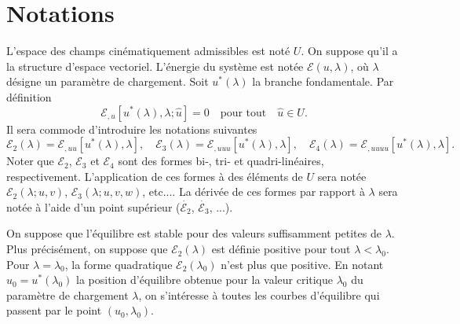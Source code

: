 \documentclass[12pt, final]{amsart}
\begin{document}
\title{\sbtitle}
\author{\sbauthor}
\address{\sbaddress}

\begin{abstract}
  blabla
\end{abstract}

\maketitle

\section{Notations}

L'espace des champs cin{\'e}matiquement admissibles est not{\'e} $U$. On
suppose qu'il a la structure d'espace vectoriel. L'{\'e}nergie du syst{\`e}me
est not{\'e}e $\mathcal{E} (u, \lambda)$, o{\`u} $\lambda$ d{\'e}signe un
param{\`e}tre de chargement. Soit $u^{\ast} (\lambda)$ la branche
fondamentale. Par d{\'e}finition
\begin{equation}
  \mathcal{E}_{, u} [u^{\ast} (\lambda), \lambda ; \hat{u}] = 0 \quad
  \text{pour tout} \quad \hat{u} \in U.
\end{equation}
Il sera commode d'introduire les notations suivantes
\begin{equation}
  \mathcal{E}_2 (\lambda) =\mathcal{E}_{, u  u}  [u^{\ast} (\lambda),
  \lambda], \quad \mathcal{E}_3 (\lambda) =\mathcal{E}_{, u  u
   u} [u^{\ast} (\lambda), \lambda], \quad \mathcal{E}_4 (\lambda)
  =\mathcal{E}_{, u  u  u  u} [u^{\ast} (\lambda),
  \lambda] .
\end{equation}
Noter que $\mathcal{E}_2$, $\mathcal{E}_3$ et $\mathcal{E}_4$ sont des formes
bi-, tri- et quadri-lin{\'e}aires, respectivement. L'application de ces formes
{\`a} des {\'e}l{\'e}ments de $U$ sera not{\'e}e $\mathcal{E}_2 (\lambda ; u,
v)$, $\mathcal{E}_3 (\lambda ; u, v, w)$, etc.... La d{\'e}riv{\'e}e de ces
formes par rapport {\`a} $\lambda$ sera not{\'e}e {\`a} l'aide d'un point
sup{\'e}rieur ($\dot{\mathcal{E}_2}$, $\dot{\mathcal{E}_3}$, ...).

On suppose que l'{\'e}quilibre est stable pour des valeurs suffisamment
petites de $\lambda$. Plus pr{\'e}cis{\'e}ment, on suppose que $\mathcal{E}_2
(\lambda)$ est d{\'e}finie positive pour tout $\lambda < \lambda_0$. Pour
$\lambda = \lambda_0$, la forme quadratique $\mathcal{E}_2 (\lambda_0)$ n'est
plus que positive. En notant $u_0 = u^{\ast} (\lambda_0)$ la position
d'{\'e}quilibre obtenue pour la valeur critique $\lambda_0$ du param{\`e}tre
de chargement $\lambda$, on s'int{\'e}resse {\`a} toutes les courbes
d'{\'e}quilibre qui passent par le point $(u_0, \lambda_0)$.
\end{document}
